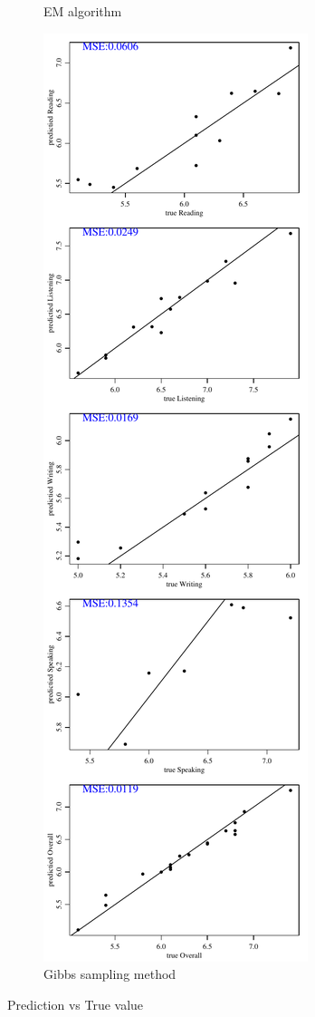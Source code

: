 \documentclass[12pt]{article}
\begin{document}
\begin{figure}[h!]
\begin{subfigure}{0.4\textwidth}
    \caption{EM algorithm}
    \label{fig:0.30-empvt}
\end{subfigure}
\begin{subfigure}{0.4\textwidth}
    \includegraphics[height=.85\textheight]{pic/0.30/Gibbs_PredvsTrue.pdf}
    \caption{Gibbs sampling method}
    \label{fig:0.30-gibbspvt}
\end{subfigure}
        
\caption{Prediction vs True value}
\label{fig:0.30-pvt}
\end{figure}
\end{document}

